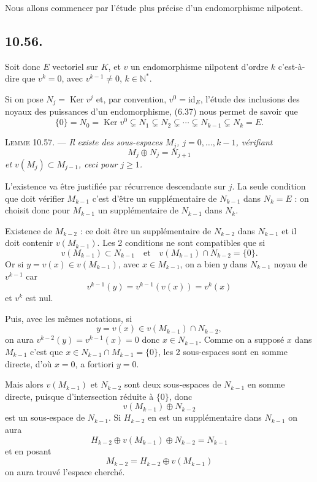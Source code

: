 
Nous allons commencer par l'étude plus précise d'un endomorphisme nilpotent.

\subsection*{10.56.}
Soit donc $E$ vectoriel sur $K$, et $v$ un endomorphisme nilpotent d'ordre $k$ c'est-à-dire que $v^k=0$, avec $v^{k-1}\ne0$, $k\in\mathbb N^*$.

Si on pose $N_j=\operatorname{Ker}v^j$ et, par convention, $v^0=\mathrm{id}_E$, l'étude des inclusions des noyaux des puissances d'un endomorphisme, (6.37) nous permet de savoir que
\[
\{0\}=N_0=\operatorname{Ker}v^0
\subsetneq N_1\subsetneq N_2\subsetneq\cdots
\subsetneq N_{k-1}\subsetneq N_k=E.
\]

\medskip\noindent\textsc{Lemme 10.57.} --- \emph{Il existe des sous-espaces $M_j$, $j=0,\ldots,k-1$, vérifiant
\[
M_j\oplus N_j=N_{j+1}
\]
et $v(M_j)\subset M_{j-1}$, ceci pour $j\ge1$.}

L'existence va être justifiée par récurrence descendante sur $j$. La seule condition que doit vérifier $M_{k-1}$ c'est d'être un supplémentaire de $N_{k-1}$ dans $N_k=E$ : on choisit donc pour $M_{k-1}$ un supplémentaire de $N_{k-1}$ dans $N_k$.

Existence de $M_{k-2}$ : ce doit être un supplémentaire de $N_{k-2}$ dans $N_{k-1}$ et il doit contenir $v(M_{k-1})$.
Les 2 conditions ne sont compatibles que si
\[
v(M_{k-1})\subset N_{k-1}
\quad\text{et}\quad
v(M_{k-1})\cap N_{k-2}=\{0\}.
\]
Or si $y=v(x)\in v(M_{k-1})$, avec $x\in M_{k-1}$, on a bien $y$ dans $N_{k-1}$ noyau de $v^{k-1}$ car
\[
v^{k-1}(y)=v^{k-1}(v(x))=v^k(x)
\]
et $v^k$ est nul.

Puis, avec les mêmes notations, si
\[
y=v(x)\in v(M_{k-1})\cap N_{k-2},
\]
on aura $v^{k-2}(y)=v^{k-1}(x)=0$ donc $x\in N_{k-1}$. Comme on a supposé $x$ dans $M_{k-1}$ c'est que $x\in N_{k-1}\cap M_{k-1}=\{0\}$, les 2 sous-espaces sont en somme directe, d'où $x=0$, a fortiori $y=0$.

Mais alors $v(M_{k-1})$ et $N_{k-2}$ sont deux sous-espaces de $N_{k-1}$ en somme directe, puisque d'intersection réduite à $\{0\}$, donc
\[
v(M_{k-1})\oplus N_{k-2}
\]
est un sous-espace de $N_{k-1}$. Si $H_{k-2}$ en est un supplémentaire dans $N_{k-1}$ on aura
\[
H_{k-2}\oplus v(M_{k-1})\oplus N_{k-2}=N_{k-1}
\]
et en posant
\[
M_{k-2}=H_{k-2}\oplus v(M_{k-1})
\]
on aura trouvé l'espace cherché.

